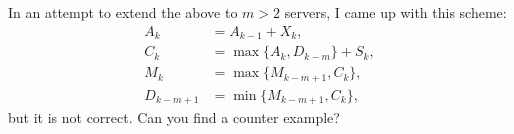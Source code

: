 \begin{exercise}
\begin{solution}
In an attempt to   extend the above to $m>2$ servers, I came up with this scheme:
      \begin{equation*}
        \begin{split}
          A_k &= A_{k-1} + X_k, \\
          C_k &= \max\{A_k, D_{k-m}\} + S_k,\\
          M_k &= \max\{M_{k-m+1}, C_k\}, \\
          D_{k-m+1} &= \min\{M_{k-m+1}, C_k\},
        \end{split}
      \end{equation*}
      but it is not correct. Can you find a counter example?
  \end{solution}
\end{exercise}



